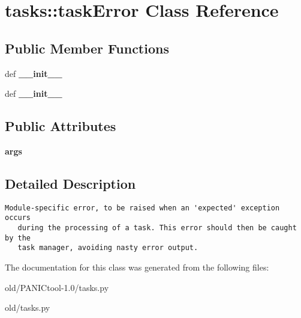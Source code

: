 \section{tasks::task\-Error Class Reference}
\label{classtasks_1_1taskError}
\subsection*{Public Member Functions}
\begin{CompactItemize}
\item 
def \textbf{\_\-\_\-init\_\-\_\-}\label{classtasks_1_1taskError_a072222b420274bbfb156e28a39df727}

\item 
def \textbf{\_\-\_\-init\_\-\_\-}\label{classtasks_1_1taskError_a072222b420274bbfb156e28a39df727}

\end{CompactItemize}
\subsection*{Public Attributes}
\begin{CompactItemize}
\item 
\textbf{args}\label{classtasks_1_1taskError_7d6e0cf7a415cd171699f9502995f90d}

\end{CompactItemize}


\subsection{Detailed Description}


\footnotesize\begin{verbatim}Module-specific error, to be raised when an 'expected' exception occurs
   during the processing of a task. This error should then be caught by the
   task manager, avoiding nasty error output.
\end{verbatim}
\normalsize
 



The documentation for this class was generated from the following files:\begin{CompactItemize}
\item 
old/PANICtool-1.0/tasks.py\item 
old/tasks.py\end{CompactItemize}
